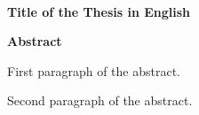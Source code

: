 




\begin{center}
  \HRule\\[0.4cm]
  \Large\bfseries
  Title of the Thesis in English
  \HRule\\[1.5cm]
\end{center}

\begin{center}
  \bfseries
  \large
  Abstract
\end{center}

\noindent
First paragraph of the abstract.
\blindtext

Second paragraph of the abstract.
\blindtext

\cleardoublepage
